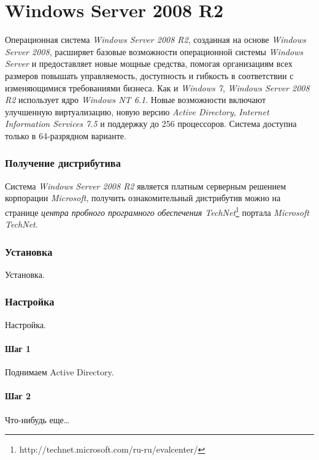 \part{Windows Server 2008 R2}
Операционная система \textit{Windows Server 2008 R2}, созданная на основе \textit{Windows Server 2008}, расширяет базовые возможности операционной системы \textit{Windows Server} и предоставляет новые мощные средства, помогая организациям всех размеров повышать управляемость, доступность и гибкость в соответствии с изменяющимися требованиями бизнеса.
Как и \textit{Windows 7}, \textit{Windows Server 2008 R2} использует ядро \textit{Windows NT 6.1}.
Новые возможности включают улучшенную виртуализацию, новую версию \textit{Active Directory}, \textit{Internet Information Services 7.5} и поддержку до 256 процессоров. Система доступна только в 64-разрядном варианте.

\section{Получение дистрибутива}
Система \textit{Windows Server 2008 R2} является платным серверным решением корпорации \textit{Microsoft}, получить ознакомительный дистрибутив можно на странице \textit{центра пробного програмного обеспечения TechNet}\footnote{http://technet.microsoft.com/ru-ru/evalcenter/} портала \textit{Microsoft TechNet}.

\section{Установка}
Установка.

\section{Настройка}
Настройка.

\subsection{Шаг 1}
Поднимаем Active Directory.

\subsection{Шаг 2}
Что-нибудь еще\ldots